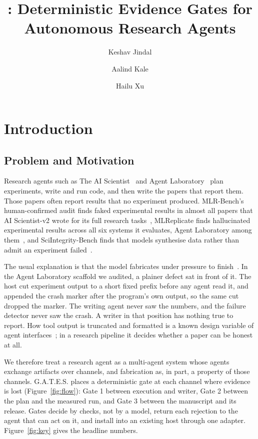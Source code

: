 \documentclass[sigconf,anonymous]{aamas}
\title{\gates: Deterministic Evidence Gates for Autonomous Research Agents}
\author{Keshav Jindal}
\affiliation{
  \institution{\todo{affiliation}}
  \country{\todo{country}}}
\author{Aalind Kale}
\affiliation{
  \institution{\todo{affiliation}}
  \country{\todo{country}}}
\author{Hailu Xu}
\affiliation{
  \institution{\todo{affiliation}}
  \country{\todo{country}}}
\newcommand{\gates}{G.A.T.E.S.}
\begin{document}
\maketitle

\section{Introduction}

\subsection{Problem and Motivation}

Research agents such as The AI Scientist~\cite{lu2024aiscientist,yamada2025aiscientistv2} and Agent Laboratory~\cite{schmidgall2025agentlab} plan experiments, write and run code, and then write the papers that report them.
Those papers often report results that no experiment produced.
MLR-Bench's human-confirmed audit finds faked experimental results in almost all papers that AI Scientist-v2 wrote for its full research tasks~\cite{chen2025mlrbench}, MLReplicate finds hallucinated experimental results across all six systems it evaluates, Agent Laboratory among them~\cite{gaddipati2026mlreplicate}, and SciIntegrity-Bench finds that models synthesise data rather than admit an experiment failed~\cite{yang2026sciintegrity}.

The usual explanation is that the model fabricates under pressure to finish~\cite{yang2026sciintegrity,kalai2025hallucinate,huang2026rewardhacking}.
In the Agent Laboratory scaffold we audited, a plainer defect sat in front of it.
The host cut experiment output to a short fixed prefix before any agent read it, and appended the crash marker after the program's own output, so the same cut dropped the marker.
The writing agent never saw the numbers, and the failure detector never saw the crash.
A writer in that position has nothing true to report.
How tool output is truncated and formatted is a known design variable of agent interfaces~\cite{yang2024sweagent}; in a research pipeline it decides whether a paper can be honest at all.

We therefore treat a research agent as a multi-agent system whose agents exchange artifacts over channels, and fabrication as, in part, a property of those channels.
\gates{} places a deterministic gate at each channel where evidence is lost (Figure~\ref{fig:flow}): Gate 1 between execution and writer, Gate 2 between the plan and the measured run, and Gate 3 between the manuscript and its release.
Gates decide by checks, not by a model, return each rejection to the agent that can act on it, and install into an existing host through one adapter.
Figure~\ref{fig:key} gives the headline numbers.
\end{document}
